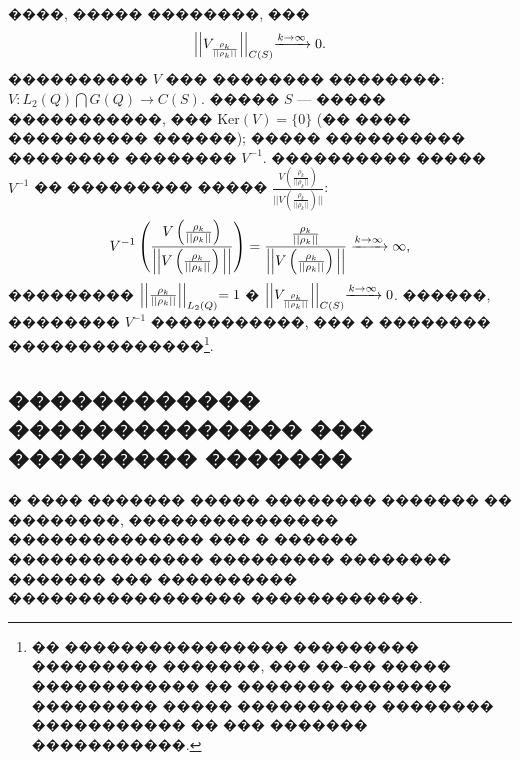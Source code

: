 \documentclass[a4paper]{article}
\begin{document}
����, ����� ��������, ��� $$\Bigl|\Bigl|V_{\frac{\rho_k}{||\rho_k ||}}  \Bigl|\Bigl|_{C(S)}\xrightarrow{k \rightarrow \infty} 0.$$
���������� $V$ ��� �������� ��������: $V: L_2(Q) \bigcap G(Q) \rightarrow C(S)$. ����� $S$ --- ����� �����������, ��� $\text{Ker} (V)=\{0\}$ (�� ���� ���������� ������);
����� ���������� �������� �������� $V^{-1}$.
���������� ����� $V^{-1}$ �� ��������� ����� $\frac{V\left(\frac{\rho_k}{||\rho_k ||}\right)}{||V\left(\frac{\rho_k}{||\rho_k ||}\right)||}$:
\begin{equation}
  V^{-1}\left(\frac{V\left(\frac{\rho_k}{||\rho_k ||}\right)}{\Bigl|\Bigl|V\left(\frac{\rho_k}{||\rho_k ||}\right)\Bigl|\Bigl|}\right)=\frac{\frac{\rho_k}{||\rho_k ||}}{\Bigl|\Bigl|V\left(\frac{\rho_k}{||\rho_k ||}\right)\Bigl|\Bigl|} \xrightarrow{k\rightarrow \infty} \infty,
\end{equation}
��������� $\Bigl|\Bigl|\frac{\rho_k}{||\rho_k ||}\Bigl|\Bigl|_{L_2(Q)}=1$ � $\Bigl|\Bigl|V_{\frac{\rho_k}{||\rho_k ||}}  \Bigl|\Bigl|_{C(S)}\xrightarrow{k \rightarrow \infty} 0$.
������, �������� $V^{-1}$ �����������, ��� � �������� ��������������\footnote{�� ���������������� ��������� ��������� �������, ��� ��-�� ����� ������������ �� ������� �������� ��������� ����� ���������� �������� ����������� �� ��� ������� �����������.}.

\subsection{������������ �������������� ��� ��������� �������}
� ���� ������� ����� �������� ������� �� ��������, ��������������� �������������� ��� � ������ �������������� ��������� �������� ������� ��� ���������� ����������������� ������������.
\end{document}
